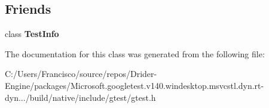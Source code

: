 \subsection*{Friends}
\begin{DoxyCompactItemize}
\item 
\mbox{\label{classtesting_1_1_test_a4c49c2cdb6c328e6b709b4542f23de3c}} 
class {\bfseries Test\+Info}
\end{DoxyCompactItemize}


The documentation for this class was generated from the following file\+:\begin{DoxyCompactItemize}
\item 
C\+:/\+Users/\+Francisco/source/repos/\+Drider-\/\+Engine/packages/\+Microsoft.\+googletest.\+v140.\+windesktop.\+msvcstl.\+dyn.\+rt-\/dyn.../build/native/include/gtest/gtest.\+h\end{DoxyCompactItemize}
